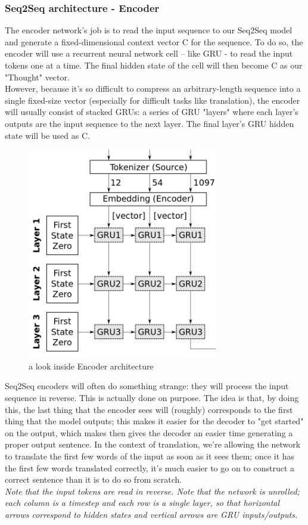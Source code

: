   \subsubsection{Seq2Seq architecture - Encoder}
  The encoder network’s job is to read the input sequence to our
Seq2Seq model and generate a fixed-dimensional context vector C
for the sequence. To do so, the encoder will use a recurrent neural
network cell – like GRU - to read the input tokens one at a time. The final hidden state of the cell will then become C as our "Thought" vector.\\
 However,
because it’s so difficult to compress an arbitrary-length sequence into
a single fixed-size vector (especially for difficult tasks like translation),
the encoder will usually consist of stacked GRUs: a series of
GRU "layers" where each layer’s outputs are the input sequence to
the next layer. The final layer’s GRU hidden state will be used as C.
 \begin{figure}[H]%
    \center%
    \includegraphics[width=.4\textwidth]{images/amir/enc.png}%
    \caption[Encoder Details]{ a look inside Encoder architecture \cite{web018}
    }\label{fig:encoder}%
  \end{figure}
Seq2Seq encoders will often do something strange: they will process
the input sequence in reverse. This is actually done on purpose.
The idea is that, by doing this, the last thing that the encoder sees
will (roughly) corresponds to the first thing that the model outputs;
this makes it easier for the decoder to "get started" on the output,
which makes then gives the decoder an easier time generating a
proper output sentence. In the context of translation, we’re allowing
the network to translate the first few words of the input as soon as it sees them; once it has the first few words translated correctly, it’s
much easier to go on to construct a correct sentence than it is to do
so from scratch. \\
\textit{Note that the input
tokens are read in reverse. Note that the
network is unrolled; each column is a
timestep and each row is a single layer,
so that horizontal arrows correspond
to hidden states and vertical arrows are
GRU inputs/outputs.}
